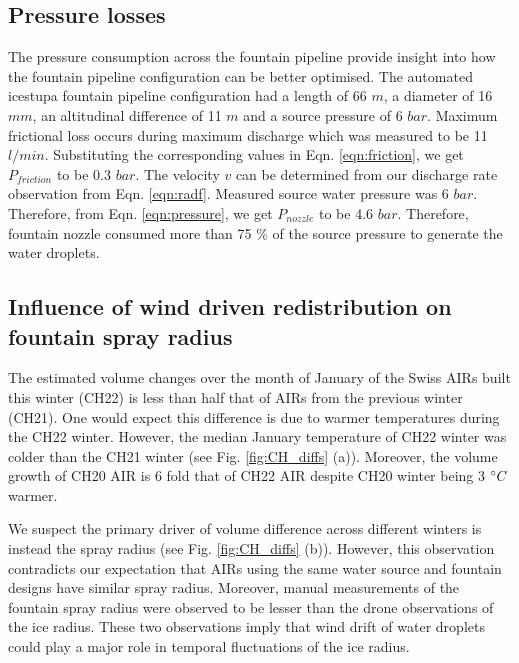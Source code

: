 \documentclass[tc, manuscript]{copernicus}
\begin{document}
\subsection{Pressure losses}

The pressure consumption across the fountain pipeline provide insight into how the fountain pipeline
configuration can be better optimised. The automated icestupa fountain pipeline configuration had a length of 66
$m$, a diameter of 16 $mm$, an altitudinal difference of 11 $m$ and a source pressure of 6 $bar$. Maximum frictional
loss occurs during maximum discharge which was measured to be 11 $l/min$. Substituting the corresponding values
in Eqn. \ref{eqn:friction}, we get $P_{friction}$ to be 0.3 $bar$. The velocity $v$ can be determined from our
discharge rate observation from Eqn. \ref{eqn:radf}. Measured source water pressure was 6 $bar$. Therefore, from
Eqn. \ref{eqn:pressure}, we get $P_{nozzle}$ to be 4.6 $bar$. Therefore, fountain nozzle consumed more than 75
\% of the source pressure to generate the water droplets. 

\subsection{Influence of wind driven redistribution on fountain spray radius}

The estimated volume changes over the month of January of the Swiss AIRs built this winter (CH22) is less than
half that of AIRs from the previous winter (CH21). One would expect this difference is due to warmer
temperatures during the CH22 winter. However, the median January temperature of CH22 winter was colder than the
CH21 winter (see Fig. \ref{fig:CH_diffs} (a)). Moreover, the volume growth of CH20 AIR is 6 fold that of CH22
AIR despite CH20 winter being 3 $^{\circ} C$ warmer.

We suspect the primary driver of volume difference across different winters is instead the spray radius (see
Fig. \ref{fig:CH_diffs} (b)). However, this observation contradicts our expectation that AIRs using the same
water source and fountain designs have similar spray radius. Moreover, manual measurements of the fountain spray
radius were observed to be lesser than the drone observations of the ice radius. These two observations imply
that wind drift of water droplets could play a major role in temporal fluctuations of the ice radius.
\end{document}
